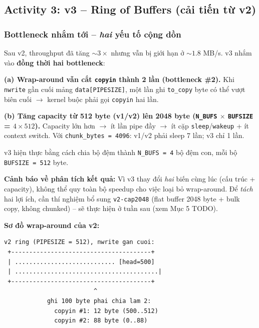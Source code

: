 \documentclass[11pt,a4paper]{article}
\begin{document}
\subsection{Activity 3: v3 -- Ring of Buffers (cải tiến từ v2)}

\subsubsection{Bottleneck nhắm tới -- \emph{hai} yếu tố cộng dồn}

Sau v2, throughput đã tăng $\sim 3\times$ nhưng vẫn bị giới hạn ở $\sim 1.8$ MB/s. v3 nhắm vào \textbf{đồng thời hai bottleneck}:

\textbf{(a) Wrap-around vẫn cắt \texttt{copyin} thành 2 lần (bottleneck \#2).}
Khi \texttt{nwrite} gần cuối mảng \texttt{data[PIPESIZE]}, một lần ghi \texttt{to\_copy} byte có thể vượt biên cuối $\rightarrow$ kernel buộc phải gọi \texttt{copyin} hai lần.

\textbf{(b) Tăng capacity từ 512 byte (v1/v2) lên 2048 byte (\texttt{N\_BUFS} $\times$ \texttt{BUFSIZE} = $4 \times 512$).}
Capacity lớn hơn $\rightarrow$ ít lần pipe đầy $\rightarrow$ ít cặp \texttt{sleep}/\texttt{wakeup} + ít context switch. Với \texttt{chunk\_bytes = 4096}: v1/v2 phải sleep 7 lần; v3 chỉ 1 lần.

v3 hiện thực bằng cách chia bộ đệm thành \texttt{N\_BUFS = 4} bộ đệm con, mỗi bộ \texttt{BUFSIZE = 512} byte.

\begin{warnbox}
\textbf{Cảnh báo về phân tích kết quả:} Vì v3 thay đổi \emph{hai} biến cùng lúc (cấu trúc + capacity), không thể quy toàn bộ speedup cho việc loại bỏ wrap-around. Để \emph{tách} hai lợi ích, cần thí nghiệm bổ sung \texttt{v2-cap2048} (flat buffer 2048 byte + bulk copy, không chunked) -- sẽ thực hiện ở tuần sau (xem Mục 5 TODO).
\end{warnbox}

\textbf{Sơ đồ wrap-around của v2:}

\begin{lstlisting}[style=plain]
 v2 ring (PIPESIZE = 512), nwrite gan cuoi:
 +---------------------------------------+
 | ............................ [head=500]
 | ........................................|
 +---------------------------------------+
                         ^
            ghi 100 byte phai chia lam 2:
              copyin #1: 12 byte (500..512)
              copyin #2: 88 byte (0..88)
\end{lstlisting}
\end{document}
